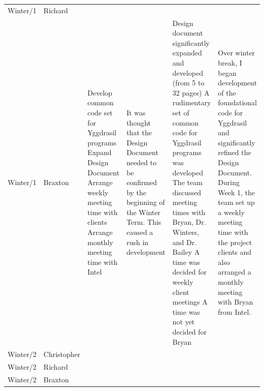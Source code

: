 \documentclass[onecolumn, draftclsnofoot,10pt, compsoc]{IEEEtran}
\begin{document}
\begin{tiny}
\begin{longtable}{ | p{} | p{} | p{} | p{} | p{} | p{} | }
&

&

&

\\ \hline
Winter/1 & Richard & 

&

&

&

\\ \hline
Winter/1 & Braxton & 

Develop common code set for Yggdrasil programs \newline
Expand Design Document \newline
Arrange weekly meeting time with clients \newline
Arrange monthly meeting time with Intel 

&

It was thought that the Design Document needed to be confirmed by the beginning of the Winter Term. This caused a rush in development

&

Design document significantly expanded and developed (from 5 to 32 pages) \newline
A rudimentary set of common code for Yggdrasil programs was developed \newline
The team discussed meeting times with Bryan, Dr. Winters, and Dr. Bailey \newline
A time was decided for weekly client meetings \newline
A time was not yet decided for Bryan 

&

Over winter break, I began development of the foundational code for Yggdrasil and significantly refined the Design Document. \newline
During Week 1, the team set up a weekly meeting time with the project clients and also arranged a monthly meeting with Bryan from Intel. 

\\ \hline
Winter/2 & Christopher & 

&

&

&

\\ \hline
Winter/2 & Richard & 

&

&

&

\\ \hline
Winter/2 & Braxton & 


\end{longtable}
\end{tiny}
\end{document}
